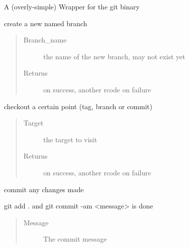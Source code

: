 \documentclass[letterpaper,10pt,english]{sphinxmanual}
\begin{document}
\begin{fulllineitems}
\label{git:crawler.git.Git}
A (overly-simple) Wrapper for the git binary

\begin{fulllineitems}
\label{git:crawler.git.Git.branch}
create a new named branch
\begin{quote}\begin{description}
\item[{Branch\_name }] \leavevmode
the name of the new branch, may not exist yet

\item[{Returns}]  on success, another rcode on failure

\end{description}\end{quote}

\end{fulllineitems}


\begin{fulllineitems}
\label{git:crawler.git.Git.checkout}
checkout a certain point (tag, branch or commit)
\begin{quote}\begin{description}
\item[{Target }] \leavevmode
the target to visit

\item[{Returns}]  on success, another rcode on failure

\end{description}\end{quote}

\end{fulllineitems}


\begin{fulllineitems}
\label{git:crawler.git.Git.commit}
commit any changes made

git add . and git commit -am \textless{}message\textgreater{} is done
\begin{quote}\begin{description}
\item[{Message }] \leavevmode
The commit message


\end{description}
\end{quote}
\end{fulllineitems}
\end{fulllineitems}
\end{document}
